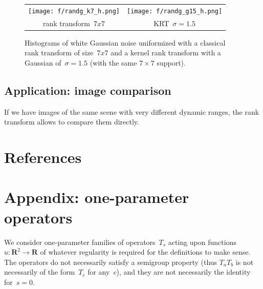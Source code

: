 \documentclass[12pt]{article}                  %
\begin{document}
\begin{figure}[p]
	\begin{tabular}{cc}
		\texttt{[image: f/randg\_k7\_h.png]} &
		\texttt{[image: f/randg\_g15\_h.png]} \\
		rank transform~$7x7$ &
		KRT~$\sigma=1.5$
	\end{tabular}
	\caption{\label{fig:histograms}
	Histograms of white Gaussian noise uniformized with a classical
	rank transform of size~$7x7$ and a kernel rank transform with a
	Gaussian of~$\sigma=1.5$ (with the same $7\times7$ support).
	}
\end{figure}


\subsection{Application: image comparison}

If we have images of the same scene with very different dynamic ranges, the
rank transform allows to compare them directly.   


\section{References}






\clearpage

\section*{Appendix: one-parameter operators}

We consider one-parameter families of operators~$T_s$ acting upon
functions~$u:\mathbf{R}^2\to\mathbf{R}$ of whatever regularity is required
for the definitions to make sense.  The operators do not necessarily satisfy
a semigroup property (thus $T_aT_b$ is not necessarily of the form~$T_c$ for
any~$c$), and they are not necessarily the identity for~$s=0$.
\end{document}
